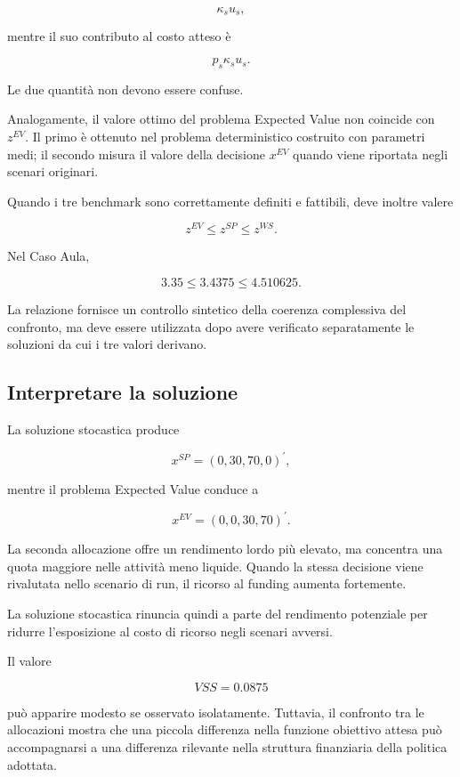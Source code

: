 \[
\kappa_su_s,
\]

\noindent mentre il suo contributo al costo atteso \`e

\[
p_s\kappa_su_s.
\]

Le due quantit\`a non devono essere confuse.

Analogamente, il valore ottimo del problema Expected Value non coincide con
\(z^{EV}\). Il primo \`e ottenuto nel problema deterministico costruito con
parametri medi; il secondo misura il valore della decisione \(x^{EV}\) quando
viene riportata negli scenari originari.

Quando i tre benchmark sono correttamente definiti e fattibili, deve inoltre
valere

\[
z^{EV}
\leq
z^{SP}
\leq
z^{WS}.
\]

Nel Caso Aula,

\[
3.35
\leq
3.4375
\leq
4.510625.
\]

La relazione fornisce un controllo sintetico della coerenza complessiva del
confronto, ma deve essere utilizzata dopo avere verificato separatamente le
soluzioni da cui i tre valori derivano.

\subsection{Interpretare la soluzione}

La soluzione stocastica produce

\[
x^{SP}
=
(0,30,70,0)^{\prime},
\]

\noindent mentre il problema Expected Value conduce a

\[
x^{EV}
=
(0,0,30,70)^{\prime}.
\]

La seconda allocazione offre un rendimento lordo pi\`u elevato, ma concentra
una quota maggiore nelle attivit\`a meno liquide. Quando la stessa decisione
viene rivalutata nello scenario di run, il ricorso al funding aumenta
fortemente.

La soluzione stocastica rinuncia quindi a parte del rendimento potenziale per
ridurre l'esposizione al costo di ricorso negli scenari avversi.

Il valore

\[
VSS=0.0875
\]

\noindent pu\`o apparire modesto se osservato isolatamente. Tuttavia, il
confronto tra le allocazioni mostra che una piccola differenza nella funzione
obiettivo attesa pu\`o accompagnarsi a una differenza rilevante nella
struttura finanziaria della politica adottata.

